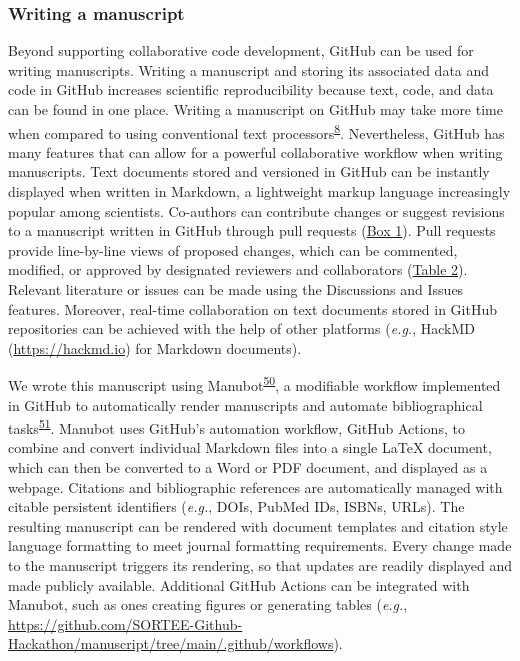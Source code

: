 \hypertarget{writing-a-manuscript}{%
\subsubsection{Writing a manuscript}\label{writing-a-manuscript}}

Beyond supporting collaborative code development, GitHub can be used for writing manuscripts.
Writing a manuscript and storing its associated data and code in GitHub increases scientific reproducibility because text, code, and data can be found in one place.
Writing a manuscript on GitHub may take more time when compared to using conventional text processors\textsuperscript{\protect\hyperlink{ref-4ny1onB0}{8}}.
Nevertheless, GitHub has many features that can allow for a powerful collaborative workflow when writing manuscripts.
Text documents stored and versioned in GitHub can be instantly displayed when written in Markdown, a lightweight markup language increasingly popular among scientists.
Co-authors can contribute changes or suggest revisions to a manuscript written in GitHub through pull requests (\protect\hyperlink{definitions}{Box 1}).
Pull requests provide line-by-line views of proposed changes, which can be commented, modified, or approved by designated reviewers and collaborators (\protect\hyperlink{tbl:roles}{Table 2}).
Relevant literature or issues can be made using the Discussions and Issues features.
Moreover, real-time collaboration on text documents stored in GitHub repositories can be achieved with the help of other platforms (\emph{e.g.}, HackMD (\url{https://hackmd.io}) for Markdown documents).

We wrote this manuscript using Manubot\textsuperscript{\protect\hyperlink{ref-Re6Eg2va}{50}}, a modifiable workflow implemented in GitHub to automatically render manuscripts and automate bibliographical tasks\textsuperscript{\protect\hyperlink{ref-YuJbg3zO}{51}}.
Manubot uses GitHub's automation workflow, GitHub Actions, to combine and convert individual Markdown files into a single LaTeX document, which can then be converted to a Word or PDF document, and displayed as a webpage.
Citations and bibliographic references are automatically managed with citable persistent identifiers (\emph{e.g.}, DOIs, PubMed IDs, ISBNs, URLs).
The resulting manuscript can be rendered with document templates and citation style language formatting to meet journal formatting requirements.
Every change made to the manuscript triggers its rendering, so that updates are readily displayed and made publicly available.
Additional GitHub Actions can be integrated with Manubot, such as ones creating figures or generating tables (\emph{e.g.}, \url{https://github.com/SORTEE-Github-Hackathon/manuscript/tree/main/.github/workflows}).

